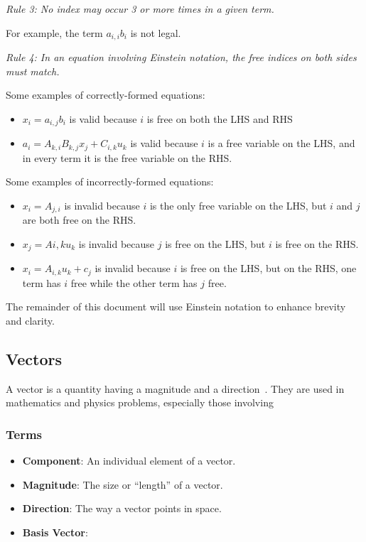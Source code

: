 \documentclass[12pt]{article}
\begin{document}
\medskip
\noindent\textit{Rule 3: No index may occur 3 or more times in a given term.}

\noindent For example, the term $a_{i,i}b_i$ is not legal.

\medskip
\noindent\textit{Rule 4: In an equation involving Einstein notation, the free indices
on both sides must match.}

\noindent Some examples of correctly-formed equations:

\begin{itemize}
\item $x_i = a_{i,j}b_i$ is valid because $i$ is free on both the LHS and RHS
\item $a_i = A_{k,i}B_{k,j}x_j + C_{i,k}u_k$ is valid because $i$ is a free variable on
      the LHS, and in every term it is the free variable on the RHS.
\end{itemize}

\noindent Some examples of incorrectly-formed equations:

\begin{itemize}
  \item $x_i = A_{j,i}$ is invalid because $i$ is the only free variable on the LHS, but
      $i$ and $j$ are both free on the RHS.
  \item $x_j = A{i,k}u_k$ is invalid because $j$ is free on the LHS, but $i$ is free on 
      the RHS.
  \item $x_i = A_{i,k}u_k + c_j$ is invalid because $i$ is free on the LHS, but on the 
      RHS, one term has $i$ free while the other term has $j$ free.
  \end{itemize}

The remainder of this document will use Einstein notation to enhance brevity and clarity.

\subsection{Vectors}
A vector is a quantity having a magnitude and a direction~\cite{Wikipedia_Vectors_2024}.
They are used in mathematics and physics problems, especially those involving 

\subsubsection{Terms}
\begin{itemize}
\item \textbf{Component}: An individual element of a vector.
\item \textbf{Magnitude}: The size or ``length'' of a vector.
\item \textbf{Direction}: The way a vector points in space.
\item \textbf{Basis Vector}: 
\end{itemize}
\end{document}
